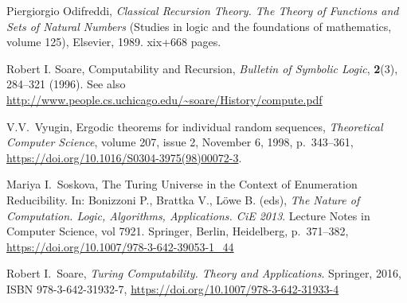 \documentclass[12pt]{article}
\theoremstyle{remark}
\newcommand{\bibquote}[1]{}
\newcommand{\nb}[1]{{\color{red}}}
\begin{document}
\begin{thebibliography}{99}


Piergiorgio Odifreddi, \emph{Classical Recursion Theory. The Theory of Functions and Sets of Natural Numbers} (Studies in logic and the foundations of mathematics, volume 125), Elsevier, 1989. xix+668 pages.

\bibquote{\nb{\rus{partial recursive functions p.127, closed under composition, primitive recursion and unrestricted $\mu$-operator ссылка на Клини 1938
recursive (general пропускается), p.22 - примитивно рекурсивные плюс минимизация, если результат (и аргумент) всюду определен. Ссылка на Kleene 1936}}}

Robert I. Soare, Computability and Recursion, \emph{Bulletin of Symbolic Logic}, \textbf{2}(3), 284--321 (1996). See also \url{http://www.people.cs.uchicago.edu/~soare/History/compute.pdf}

V.V.~Vyugin, Ergodic theorems for individual random sequences, \emph{Theoretical Computer Science}, volume 207, issue 2,  November 6, 1998, p.~343--361, \url{https://doi.org/10.1016/S0304-3975(98)00072-3}.

Mariya I.~Soskova, The Turing Universe in the Context of Enumeration Reducibility. In: Bonizzoni P., Brattka V., Löwe B. (eds), \emph{The Nature of Computation. Logic, Algorithms, Applications. CiE 2013}. Lecture Notes in Computer Science, vol 7921. Springer, Berlin, Heidelberg, p.~371--382, \url{https://doi.org/10.1007/978-3-642-39053-1_44}

Robert I.~Soare, \emph{Turing Computability. Theory and Applications}. Springer, 2016, ISBN 978-3-642-31932-7, \url{https://doi.org/10.1007/978-3-642-31933-4}

\bibquote{\nb{%
``Definition 1.7.5. (Acceptable Numbering Conditions). Let $\mathcal{P}$ be the class of partial computable funcitons of one variable. 

(i) A \emph{numbering} of a p.c. fuinctions is a map from $\omega$ onto $\mathcal{P}$.

(ii) The numbering $\{\varphi_e\}_{e\in\omega}$ of definition 1.5.1 is called the \emph{standard} numbering or \emph{canonical} numbering of the partial computable functions.

}}
\end{thebibliography}
\end{document}
